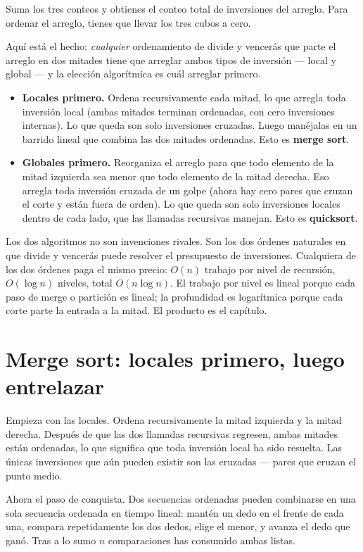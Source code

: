 \documentclass[11pt,a4paper]{article}
\begin{document}
Suma los tres conteos y obtienes el conteo total de inversiones del arreglo. Para ordenar el arreglo, tienes que llevar los tres cubos a cero.

Aquí está el hecho: \emph{cualquier} ordenamiento de divide y vencerás que parte el arreglo en dos mitades tiene que arreglar ambos tipos de inversión --- local y global --- y la elección algorítmica es cuál arreglar primero.

\begin{itemize}
\item \textbf{Locales primero.} Ordena recursivamente cada mitad, lo que arregla toda inversión local (ambas mitades terminan ordenadas, con cero inversiones internas). Lo que queda son solo inversiones cruzadas. Luego manéjalas en un barrido lineal que combina las dos mitades ordenadas. Esto es \textbf{merge sort}.
\item \textbf{Globales primero.} Reorganiza el arreglo para que todo elemento de la mitad izquierda sea menor que todo elemento de la mitad derecha. Eso arregla toda inversión cruzada de un golpe (ahora hay cero pares que cruzan el corte y están fuera de orden). Lo que queda son solo inversiones locales dentro de cada lado, que las llamadas recursivas manejan. Esto es \textbf{quicksort}.
\end{itemize}

Los dos algoritmos no son invenciones rivales. Son los dos órdenes naturales en que divide y vencerás puede resolver el presupuesto de inversiones. Cualquiera de los dos órdenes paga el mismo precio: $O(n)$ trabajo por nivel de recursión, $O(\log n)$ niveles, total $O(n \log n)$. El trabajo por nivel es lineal porque cada paso de merge o partición es lineal; la profundidad es logarítmica porque cada corte parte la entrada a la mitad. El producto es el capítulo.

\section{Merge sort: locales primero, luego entrelazar}

Empieza con las locales. Ordena recursivamente la mitad izquierda y la mitad derecha. Después de que las dos llamadas recursivas regresen, ambas mitades están ordenadas, lo que significa que toda inversión local ha sido resuelta. Las únicas inversiones que aún pueden existir son las cruzadas --- pares que cruzan el punto medio.

Ahora el paso de conquista. Dos secuencias ordenadas pueden combinarse en una sola secuencia ordenada en tiempo lineal: mantén un dedo en el frente de cada una, compara repetidamente los dos dedos, elige el menor, y avanza el dedo que ganó. Tras a lo sumo $n$ comparaciones has consumido ambas listas.
\end{document}
